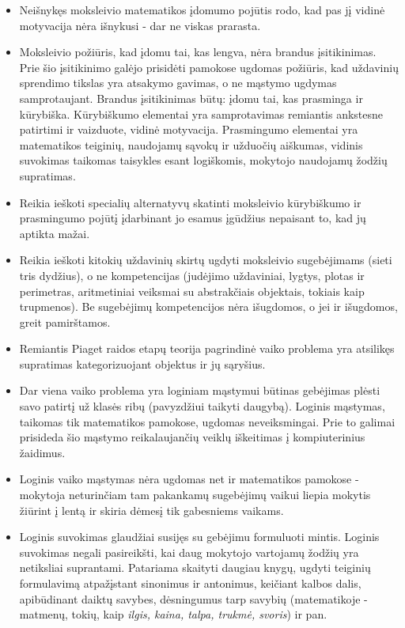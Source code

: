 \documentclass{article}
\begin{document}
\begin{itemize}
\item Neišnykęs moksleivio matematikos įdomumo pojūtis rodo, kad pas jį vidinė motyvacija nėra išnykusi - dar ne viskas prarasta. 
\item Moksleivio požiūris, kad įdomu tai, kas lengva, nėra brandus įsitikinimas. Prie šio įsitikinimo galėjo prisidėti pamokose ugdomas požiūris, kad uždavinių sprendimo tikslas yra atsakymo gavimas, o ne mąstymo ugdymas samprotaujant. Brandus įsitikinimas būtų: įdomu tai, kas prasminga ir kūrybiška. Kūrybiškumo elementai yra samprotavimas remiantis ankstesne patirtimi ir vaizduote, vidinė motyvacija. Prasmingumo elementai yra matematikos teiginių, naudojamų sąvokų ir užduočių aiškumas, vidinis suvokimas taikomas taisykles esant logiškomis, mokytojo naudojamų žodžių supratimas.
\item Reikia ieškoti specialių alternatyvų skatinti moksleivio kūrybiškumo ir prasmingumo pojūtį įdarbinant jo esamus įgūdžius nepaisant to, kad jų aptikta mažai.
\item Reikia ieškoti kitokių uždavinių skirtų ugdyti moksleivio sugebėjimams (sieti tris dydžius), o ne kompetencijas (judėjimo uždaviniai, lygtys, plotas ir perimetras, aritmetiniai veiksmai su abstrakčiais objektais, tokiais kaip trupmenos). Be sugebėjimų kompetencijos nėra išugdomos, o jei ir išugdomos, greit pamirštamos. 
\item Remiantis Piaget raidos etapų teorija pagrindinė vaiko problema yra atsilikęs supratimas kategorizuojant objektus ir jų sąryšius. 
\item Dar viena vaiko problema yra loginiam mąstymui būtinas gebėjimas plėsti savo patirtį už klasės ribų (pavyzdžiui taikyti daugybą). Loginis mąstymas, taikomas tik matematikos pamokose, ugdomas neveiksmingai. Prie to galimai prisideda šio mąstymo reikalaujančių veiklų iškeitimas į kompiuterinius žaidimus.
\item Loginis vaiko mąstymas nėra ugdomas net ir matematikos pamokose - mokytoja neturinčiam tam pakankamų sugebėjimų vaikui liepia mokytis žiūrint į lentą ir skiria dėmesį tik gabesniems vaikams.
\item Loginis suvokimas glaudžiai susijęs su gebėjimu formuluoti mintis. Loginis suvokimas negali pasireikšti, kai daug mokytojo vartojamų žodžių yra netiksliai suprantami. Patariama skaityti daugiau knygų, ugdyti teiginių formulavimą atpažįstant sinonimus ir antonimus, keičiant kalbos dalis, apibūdinant daiktų savybes, dėsningumus tarp savybių (matematikoje - matmenų, tokių, kaip \textit{ilgis, kaina, talpa, trukmė, svoris}) ir pan.
\end{itemize}
\end{document}
